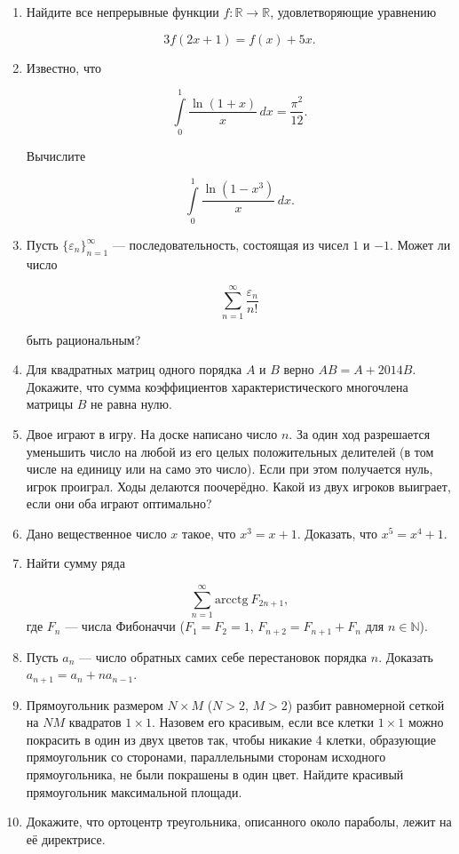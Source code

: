 \begin{enumerate}
\item Найдите все непрерывные функции $f: \mathbb{R} \rightarrow \mathbb{R}$, удовлетворяющие уравнению

$$ 3 f(2 x + 1) = f( x ) + 5 x.$$

\item Известно, что

$$ \int\limits_{0}^{1} \frac{\ln(1+x)}{x}\,dx = \frac{\pi^2}{12}.$$

Вычислите

$$ \int\limits_{0}^{1} \frac{\ln(1-x^3)}{x}\,dx.$$

\item Пусть $\{ \varepsilon_n \}_{n=1}^{\infty}$ --- последовательность, состоящая из чисел $1$ и $-1$. Может ли число

$$\sum_{n=1}^{\infty} \frac{\varepsilon_n}{n!}$$

быть рациональным?

\item Для квадратных матриц одного порядка $A$ и $B$ верно $AB = A + 2014B$. Докажите, что сумма коэффициентов характеристического многочлена матрицы $B$ не равна нулю.

\item Двое играют в игру. На доске написано число $n$. За один ход разрешается уменьшить число на любой из его целых положительных делителей (в том числе на единицу или на само это число). Если при этом получается нуль, игрок проиграл. Ходы делаются поочерёдно. Какой из двух игроков выиграет, если они оба играют оптимально?

\item Дано вещественное число $x$ такое, что $x^3 = x + 1$. Доказать, что $x^5 = x^4 + 1$.

\item  Найти сумму ряда

$$\sum_{n=1}^{\infty} {\mathrm{arcctg}}~{F_{2n+1}}, $$
где $F_n$ --- числа Фибоначчи ($F_1=F_2=1$, $F_{n+2} = F_{n+1}+F_n$ для $n\in\mathbb N$).

\item Пусть $a_n$ --- число обратных самих себе перестановок порядка $n$. Доказать $a_{n+1} = a_n + n a_{n-1}$.

\item Прямоугольник размером $N \times M$ ($N>2$, $M>2$) разбит равномерной сеткой на $N M$ квадратов $1 \times 1$. Назовем его красивым, если все клетки $1 \times 1$ можно покрасить в один из двух цветов так, чтобы никакие 4 клетки, образующие прямоугольник со сторонами, параллельными сторонам исходного прямоугольника, не были покрашены в один цвет. Найдите красивый прямоугольник максимальной площади.

\item Докажите, что ортоцентр треугольника, описанного около параболы, лежит на её директрисе.
 
\end{enumerate}